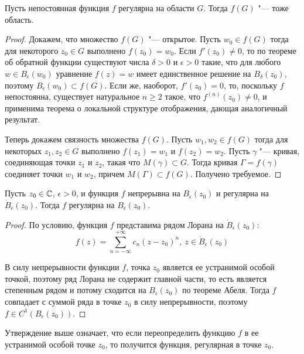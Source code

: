 \begin{theorem}
	Пусть непостоянная функция $f$ регулярна на области $G$. Тогда $f(G)$ "--- тоже область.
\end{theorem}

\begin{proof}
	Докажем, что множество $f(G)$ "--- открытое. Пусть $w_0 \in f(G)$ тогда для некоторого $z_0 \in G$ выполнено $f(z_0) = w_0$. Если $f'(z_0) \ne 0$, то по теореме об обратной функции существуют числа $\delta > 0$ и $\epsilon > 0$ такие, что для любого $w \in B_\epsilon(w_0)$ уравнение $f(z) = w$ имеет единственное решение на $B_\delta(z_0)$, поэтому $B_\epsilon(w_0) \subset f(G)$. Если же, наоборот, $f'(z_0) = 0$, то, поскольку $f$ непостоянна, существует натуральное $n \ge 2$ такое, что $f^{(n)}(z_0) \ne 0$, и применима теорема о локальной структуре отображения, дающая аналогичный результат.
	
	Теперь докажем связность множества $f(G)$. Пусть $w_1, w_2 \in f(G)$ тогда для некоторых $z_1, z_2 \in G$ выполнено $f(z_1) = w_1$ и $f(z_2) = w_2$. Пусть $\gamma$ "--- кривая, соединяющая точки $z_1$ и $z_2$, такая что $M(\gamma) \subset G$. Тогда кривая $\Gamma = f(\gamma)$ соединяет точки $w_1$ и $w_2$, причем $M(\Gamma) \subset f(G)$. Получено требуемое.
\end{proof}

\begin{proposition}
	Пусть $z_0 \in \mathbb{C}$, $\epsilon > 0$, и функция $f$ непрерывна на $B_\epsilon(z_0)$ и регулярна на $\mathring B_\epsilon(z_0)$. Тогда $f$ регулярна на $B_\epsilon(z_0)$.
\end{proposition}

\begin{proof}
	По условию, функция $f$ представима рядом Лорана на $\mathring B_\epsilon(z_0)$:
	\[f(z) = \sum_{n = -\infty}^{+\infty}c_n(z-z_0)^n,~z \in \mathring B_\epsilon(z_0)\]
	
	В силу непрерывности функции $f$, точка $z_0$ является ее устранимой особой точкой, поэтому ряд Лорана не содержит главной части, то есть является степенным рядом и потому сходится на $B_\epsilon(z_0)$ по теореме Абеля. Тогда $f$ совпадает с суммой ряда в точке $z_0$ в силу непрерывности, поэтому $f \in C^1(B_\epsilon(z_0))$.
\end{proof}

\begin{note}
	Утверждение выше означает, что если переопределить функцию $f$ в ее устранимой особой точке $z_0$, то получится функция, регулярная в точке $z_0$.
\end{note}